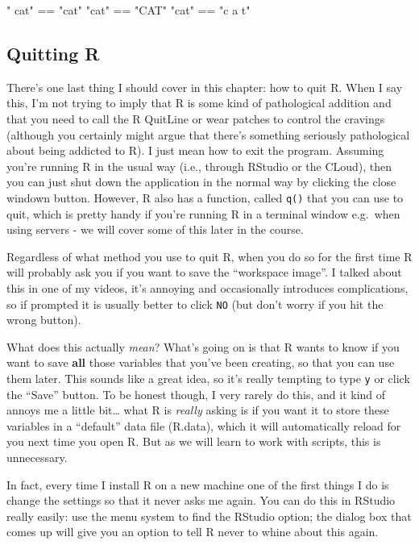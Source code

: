 \documentclass[
]{book}
\newenvironment{Shaded}{\begin{snugshade}}{\end{snugshade}}
\newcommand{\SpecialCharTok}[1]{\textcolor[rgb]{0.00,0.00,0.00}{#1}}
\newcommand{\StringTok}[1]{\textcolor[rgb]{0.31,0.60,0.02}{#1}}
\begin{document}
\begin{Shaded}
\begin{Highlighting}[]
\StringTok{" cat"} \SpecialCharTok{==} \StringTok{"cat"}
\StringTok{"cat"} \SpecialCharTok{==} \StringTok{"CAT"}
\StringTok{"cat"} \SpecialCharTok{==} \StringTok{"c a t"}
\end{Highlighting}
\end{Shaded}

\hypertarget{quitting-r}{%
\subsection{Quitting R}\label{quitting-r}}

There's one last thing I should cover in this chapter: how to quit R. When I say this, I'm not trying to imply that R is some kind of pathological addition and that you need to call the R QuitLine or wear patches to control the cravings (although you certainly might argue that there's something seriously pathological about being addicted to R). I just mean how to exit the program. Assuming you're running R in the usual way (i.e., through RStudio or the CLoud), then you can just shut down the application in the normal way by clicking the close windown button. However, R also has a function, called \texttt{q()} that you can use to quit, which is pretty handy if you're running R in a terminal window e.g.~when using servers - we will cover some of this later in the course.

Regardless of what method you use to quit R, when you do so for the first time R will probably ask you if you want to save the ``workspace image''. I talked about this in one of my videos, it's annoying and occasionally introduces complications, so if prompted it is usually better to click \texttt{NO} (but don't worry if you hit the wrong button).

What does this actually \emph{mean}? What's going on is that R wants to know if you want to save \textbf{all} those variables that you've been creating, so that you can use them later. This sounds like a great idea, so it's really tempting to type \texttt{y} or click the ``Save'' button. To be honest though, I very rarely do this, and it kind of annoys me a little bit\ldots{} what R is \emph{really} asking is if you want it to store these variables in a ``default'' data file (R.data), which it will automatically reload for you next time you open R. But as we will learn to work with scripts, this is unnecessary.

In fact, every time I install R on a new machine one of the first things I do is change the settings so that it never asks me again. You can do this in RStudio really easily: use the menu system to find the RStudio option; the dialog box that comes up will give you an option to tell R never to whine about this again.
\end{document}
